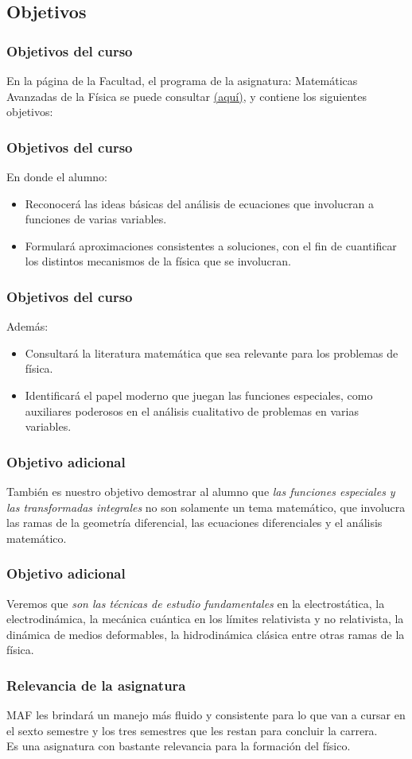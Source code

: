 \subsection{Objetivos}

\begin{frame}
\frametitle{Objetivos del curso}
En la página de la Facultad, el programa de la asignatura: Matemáticas Avanzadas de la Física se puede consultar \href{http://www.fciencias.unam.mx/asignaturas/610.pdf}{(aquí)}, y contiene los siguientes objetivos:
\end{frame}
\begin{frame}
\frametitle{Objetivos del curso}
En donde el alumno:
\begin{itemize}
\setlength{\itemsep}{0mm}
\item Reconocerá las ideas básicas del análisis de ecuaciones que involucran a funciones de varias variables.
\item Formulará aproximaciones consistentes a soluciones, con el fin de cuantificar los distintos mecanismos de la física que se involucran.
\end{itemize}
\end{frame}
\begin{frame}
\frametitle{Objetivos del curso}
Además:
\begin{itemize}
\setlength{\itemsep}{0mm}
\item Consultará la literatura matemática que sea relevante para los problemas de física.
\item Identificará el papel moderno que juegan las funciones especiales, como auxiliares poderosos en el análisis cualitativo de problemas en varias variables.
\end{itemize}
\end{frame}
\begin{frame}
\frametitle{Objetivo adicional}
También es nuestro objetivo demostrar al alumno que \emph{las funciones especiales y las transformadas integrales} no son solamente un tema matemático, que involucra las ramas de la geometría diferencial, las ecuaciones diferenciales y el análisis matemático.
\end{frame}
\begin{frame}
\frametitle{Objetivo adicional}
Veremos que \emph{son las técnicas de estudio fundamentales} en la electrostática, la electrodinámica, la mecánica cuántica en los límites relativista y no relativista, la dinámica de medios deformables, la hidrodinámica clásica entre otras ramas de la física.
\end{frame}
\begin{frame}
\frametitle{Relevancia de la asignatura}
MAF les brindará un manejo más fluido y consistente para lo que van a cursar en el sexto semestre y los tres semestres que les restan para concluir la carrera.
\\
\bigskip
\pause
Es una asignatura con bastante relevancia para la formación del físico.
\end{frame}

